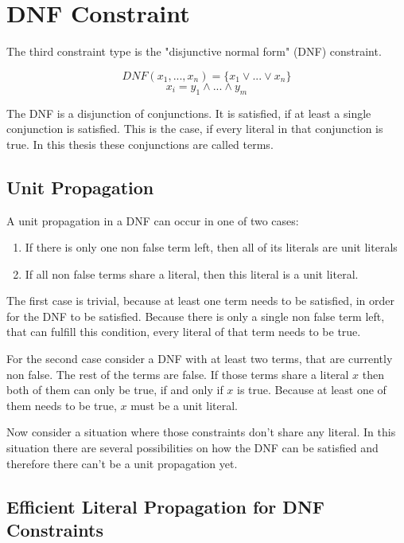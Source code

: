 \section{DNF Constraint}
The third constraint type is the "disjunctive normal form" (DNF) constraint.
\begin{leftbar}
\begin{displaymath}
DNF(x_1,...,x_n) = \{x_1 \vee ... \vee x_n \}
\end{displaymath}
\begin{displaymath}
x_i = y_1 \wedge ... \wedge y_m
\end{displaymath}
\end{leftbar}
The DNF is a disjunction of conjunctions. It is satisfied, if at least a single conjunction is satisfied. This is the case, if every literal in that conjunction is true. In this thesis these conjunctions are called terms.

\subsection{Unit Propagation}
A unit propagation in a DNF can occur in one of two cases:
\begin{leftbar}
\begin{enumerate}
\item If there is only one non false term left, then all of its literals are unit literals
\item If all non false terms share a literal, then this literal is a unit literal.
\end{enumerate}
\end{leftbar}
The first case is trivial, because at least one term needs to be satisfied, in order for the DNF to be satisfied. Because there is only a single non false term left, that can fulfill this condition, every literal of that term needs to be true.
\par
For the second case consider a DNF with at least two terms, that are currently non false. The rest of the terms are false. If those terms share a literal $x$ then both of them can only be true, if and only if $x$ is true. Because at least one of them needs to be true, $x$ must be a unit literal.
\par
Now consider a situation where those constraints don't share any literal. In this situation there are several possibilities on how the DNF can be satisfied and therefore there can't  be a unit propagation yet.

\subsection{Efficient Literal Propagation for DNF Constraints}

